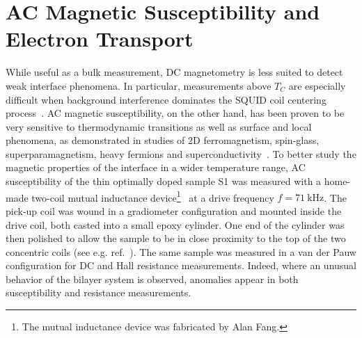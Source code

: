 \FloatBarrier%
\section{AC Magnetic Susceptibility and Electron Transport}
While useful as a bulk measurement, DC magnetometry is less suited to detect weak interface phenomena. In particular, measurements above $T_C$ are especially difficult when background interference dominates the SQUID coil centering process~\cite{squid_center_error}. AC magnetic susceptibility, on the other hand, has been proven to be very sensitive to thermodynamic transitions as well as surface and local phenomena, as demonstrated in studies of 2D ferromagnetism, spin-glass, superparamagnetism, heavy fermions and superconductivity~\cite{ac_nitroxide, ac_spin_glass, ac_superpara, Ando1994, Gegenwart2005, Schemm2014}. To better study the magnetic properties of the interface in a wider temperature range, AC susceptibility of the thin optimally doped sample S1 was measured with a home-made two-coil mutual inductance device\footnote{The mutual inductance device was fabricated by Alan Fang.}~\cite{Jeanneret1989,Yazdani1993} at a drive frequency $f=71~\mathrm{kHz}$. The pick-up coil was wound in a gradiometer configuration and mounted inside the drive coil, both casted into a small epoxy cylinder. One end of the cylinder was then polished to allow the sample to be in close proximity to the top of the two concentric coils (see e.g. ref.~\cite{YazdaniThesis}). The same sample was measured in a van der Pauw configuration for DC and Hall resistance measurements. Indeed, where an unusual behavior of the bilayer system is observed, anomalies appear in both susceptibility and resistance measurements.

